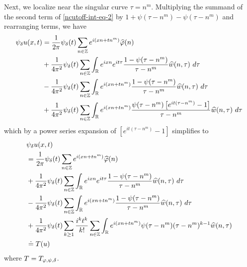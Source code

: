 %
%
%
Next, we localize near the singular curve $\tau =  n^m$.  Multiplying the
summand of the second term of \eqref{ncutoff-int-eq-2} by $1 + \psi(\tau -
n^m) - \psi(\tau -
n^m) $ and
rearranging terms, we have
%
%
\begin{equation*}
	\begin{split}
    \psi_{\delta} u(x, t)
		& = \frac{1}{2 \pi} \psi_{\delta}(t) \sum_{n \in \mathbb{Z}} e^{i(xn + t n^{m 
		})} \widehat{\varphi}(n) 
		\\
		& + \frac{1}{4 \pi^2} \psi_{\delta}(t) \sum_{n \in \mathbb{Z}} \int_{\mathbb{R}} e^{ixn}  
		e^{it \tau} \frac{ 1 - \psi(\tau - n^m) 
		}{\tau - n^m} \widehat{w}(n, \tau) \ d \tau
		\\
		& - \frac{1}{4 \pi^2} \psi_{\delta}(t) \sum_{n \in \mathbb{Z}} \int _{\mathbb{R}} e^{i(xn + 
		t n^m)}
		 \frac{1- \psi(\tau - n^m)}{\tau - n^m} \widehat{w}(n, \tau) \ d \tau
		\\
		& + \frac{1}{4 \pi^2} \psi_{\delta}(t) \sum_{n \in \mathbb{Z}} \int_{\mathbb{R}}
		e^{i(xn + t n^m)}
		\frac{\psi(\tau - n^m)\left[ e^{it(\tau - n^m)}-1 
		\right]}{\tau - n^m} \widehat{w}(n, \tau) \ d \tau
	\end{split}
\end{equation*}
%
%
which by a power series expansion of $[e^{it(\tau - n^m)}-1]$ simplifies  
to
%
%
\begin{align}
	\label{nmain-int-expression-0}
  & \psi_{\delta} u(x, t) 
		\\
		\label{nmain-int-expression-1}
		& = \frac{1}{2 \pi} \psi_{\delta}(t) \sum_{n \in \mathbb{Z}} e^{i(xn + tn^{m 
		})} \widehat{\varphi}(n) 
		\\
		\label{nmain-int-expression-2}
		& + \frac{1}{4 \pi^2} \psi_{\delta}(t) \sum_{n\in \mathbb{Z}} \int_{\mathbb{R}} e^{ixn}  
		e^{it \tau} \frac{ 1 - \psi(\tau -  n^m) 
		}{\tau -  n^m} \widehat{w}(n, \tau) \ d \tau
		\\
		\label{nmain-int-expression-3}
		& - \frac{1}{4 \pi^2} \psi_{\delta}(t) \sum_{n\in \mathbb{Z}} \int_{\mathbb{R}} e^{i(xn + 
		t n^m)}
		 \frac{1- \psi(\tau -  n^m)}{\tau -  n^m} \widehat{w}(n, \tau) \ d \tau
		\\
		\label{nmain-int-expression-4}
		& + \frac{1}{4 \pi^2} \psi_{\delta}(t) \sum_{k \ge 1} \frac{i^k t^k}{k!}
		\sum_{n \in \mathbb{Z}} \int_{\mathbb{R}} e^{i(xn + t n^m )}
		\psi(\tau -  n^m) (\tau -  n^m)^{k-1} \widehat{w}(n, \tau)  
		\\
		& \doteq T(u) \notag
\end{align}
%
%
where $T = T_{\varphi, \psi, \delta}$. 
